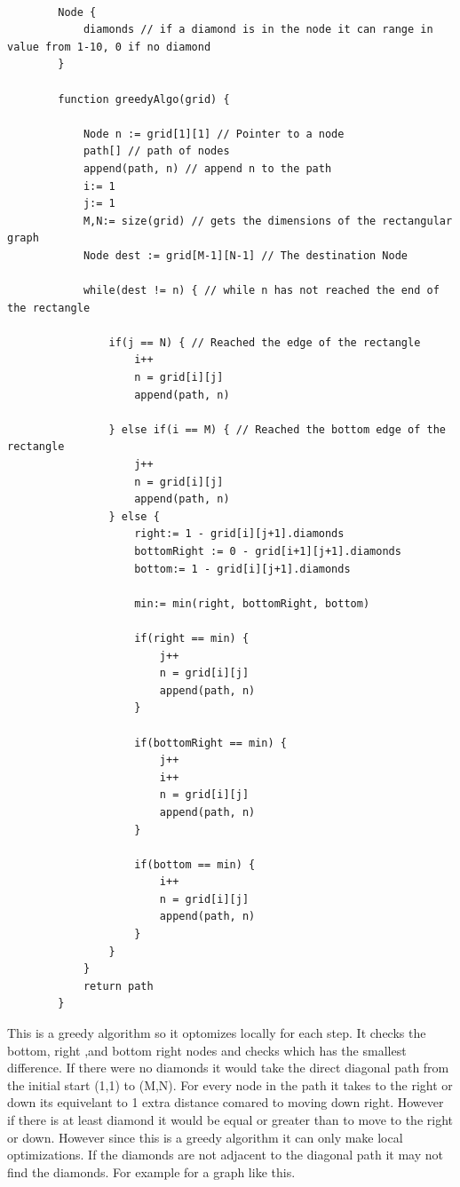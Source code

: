 \documentclass[11pt]{article}
\begin{document}
    \begin{verbatim}

        Node {
            diamonds // if a diamond is in the node it can range in value from 1-10, 0 if no diamond
        }

        function greedyAlgo(grid) {

            Node n := grid[1][1] // Pointer to a node
            path[] // path of nodes
            append(path, n) // append n to the path
            i:= 1
            j:= 1
            M,N:= size(grid) // gets the dimensions of the rectangular graph
            Node dest := grid[M-1][N-1] // The destination Node

            while(dest != n) { // while n has not reached the end of the rectangle

                if(j == N) { // Reached the edge of the rectangle
                    i++
                    n = grid[i][j]
                    append(path, n)

                } else if(i == M) { // Reached the bottom edge of the rectangle
                    j++
                    n = grid[i][j]
                    append(path, n)
                } else {
                    right:= 1 - grid[i][j+1].diamonds
                    bottomRight := 0 - grid[i+1][j+1].diamonds
                    bottom:= 1 - grid[i][j+1].diamonds

                    min:= min(right, bottomRight, bottom)

                    if(right == min) {
                        j++
                        n = grid[i][j]
                        append(path, n)
                    }

                    if(bottomRight == min) {
                        j++
                        i++
                        n = grid[i][j]
                        append(path, n)
                    }

                    if(bottom == min) {
                        i++
                        n = grid[i][j]
                        append(path, n)
                    }
                }
            }
            return path
        }

    \end{verbatim}

    This is a greedy algorithm so it optomizes locally for each step.
    It checks the bottom, right ,and bottom right nodes and checks which has
    the smallest difference. If there were no diamonds it would take the direct
    diagonal path from the initial start (1,1) to (M,N). For every node in the
    path it takes to the right or down its equivelant to 1 extra distance comared
    to moving down right. However if there is at least diamond it would be equal
    or greater than to move to the right or down. However since this is a greedy
    algorithm it can only make local optimizations. If the diamonds are not
    adjacent to the diagonal path it may not find the diamonds. For example
    for a graph like this.
\end{document}
